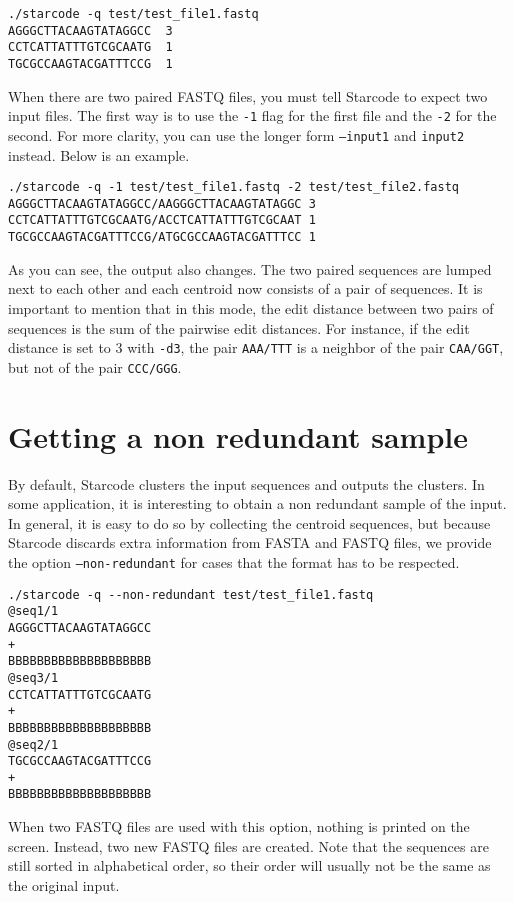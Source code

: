 \documentclass[12pt]{article}
\begin{document}
\begin{verbatim}
./starcode -q test/test_file1.fastq
AGGGCTTACAAGTATAGGCC  3
CCTCATTATTTGTCGCAATG  1
TGCGCCAAGTACGATTTCCG  1
\end{verbatim}

When there are two paired FASTQ files, you must tell Starcode to
expect two input files. The first way is to use the \texttt{-1}
flag for the first file and the \texttt{-2} for the second.
For more clarity, you can use the longer form \texttt{--input1}
and \texttt{input2} instead. Below is an example.

\begin{verbatim}
./starcode -q -1 test/test_file1.fastq -2 test/test_file2.fastq
AGGGCTTACAAGTATAGGCC/AAGGGCTTACAAGTATAGGC 3
CCTCATTATTTGTCGCAATG/ACCTCATTATTTGTCGCAAT 1
TGCGCCAAGTACGATTTCCG/ATGCGCCAAGTACGATTTCC 1
\end{verbatim}

As you can see, the output also changes. The two paired sequences
are lumped next to each other and each centroid now consists of
a pair of sequences. It is important to mention that in this
mode, the edit distance between two pairs of sequences is the sum
of the pairwise edit distances. For instance, if the edit distance
is set to 3 with \texttt{-d3}, the pair \texttt{AAA/TTT} is a
neighbor of the pair \texttt{CAA/GGT}, but not of the pair
\texttt{CCC/GGG}.

\section{Getting a non redundant sample}

By default, Starcode clusters the input sequences and outputs the
clusters. In some application, it is interesting to obtain a non
redundant sample of the input. In general, it is easy to do so by
collecting the centroid sequences, but because Starcode discards
extra information from FASTA and FASTQ files, we provide the
option \texttt{--non-redundant} for cases that the format has to
be respected.

\begin{verbatim}
./starcode -q --non-redundant test/test_file1.fastq
@seq1/1
AGGGCTTACAAGTATAGGCC
+
BBBBBBBBBBBBBBBBBBBB
@seq3/1
CCTCATTATTTGTCGCAATG
+
BBBBBBBBBBBBBBBBBBBB
@seq2/1
TGCGCCAAGTACGATTTCCG
+
BBBBBBBBBBBBBBBBBBBB
\end{verbatim}

When two FASTQ files are used with this option, nothing is
printed on the screen. Instead, two new FASTQ files are created.
Note that the sequences are still sorted in alphabetical order,
so their order will usually not be the same as the original input.
\end{document}

